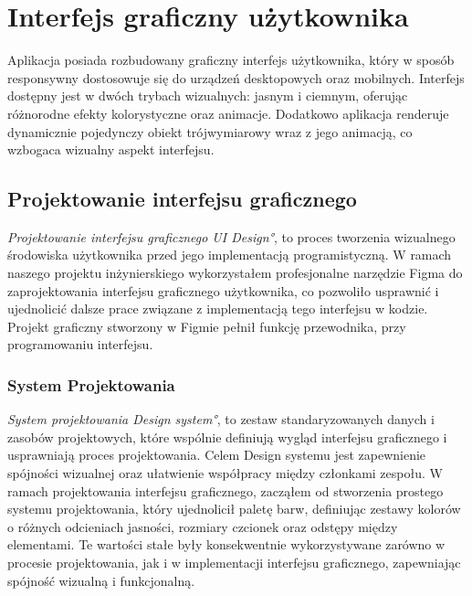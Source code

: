 \chapter{Interfejs graficzny użytkownika}
\label{chap:InterfejsGraficznyUżytkownika}
Aplikacja posiada rozbudowany graficzny interfejs użytkownika, który w sposób responsywny dostosowuje się do urządzeń desktopowych oraz mobilnych. Interfejs dostępny jest w dwóch trybach wizualnych: jasnym i ciemnym, oferując różnorodne efekty kolorystyczne oraz animacje. Dodatkowo aplikacja renderuje dynamicznie pojedynczy obiekt trójwymiarowy wraz z jego animacją, co wzbogaca wizualny aspekt interfejsu.

\section{Projektowanie interfejsu graficznego}
\label{sec:ProjektowanieInterfejsuGraficznego}

\emph{Projektowanie interfejsu graficznego \ang{UI Design}}, to proces tworzenia wizualnego środowiska użytkownika przed jego implementacją programistyczną. W ramach naszego projektu inżynierskiego wykorzystałem profesjonalne narzędzie Figma \cite{Figma} do zaprojektowania interfejsu graficznego użytkownika, co pozwoliło usprawnić i ujednolicić dalsze prace związane z implementacją tego interfejsu w kodzie. Projekt graficzny stworzony w Figmie pełnił funkcję przewodnika, przy programowaniu interfejsu.


\subsection{System Projektowania}
\label{sec:SystemProjektowania}

\emph{System projektowania \ang{Design system}}, to zestaw standaryzowanych danych i zasobów projektowych, które wspólnie definiują wygląd interfejsu graficznego i usprawniają proces projektowania. Celem Design systemu jest zapewnienie spójności wizualnej oraz ułatwienie współpracy między członkami zespołu. 
W ramach projektowania interfejsu graficznego, zacząłem od stworzenia prostego systemu projektowania, który ujednolicił paletę barw, definiując zestawy kolorów o różnych odcieniach jasności, rozmiary czcionek oraz odstępy między elementami. Te wartości stałe były konsekwentnie wykorzystywane zarówno w procesie projektowania, jak i w implementacji interfejsu graficznego, zapewniając spójność wizualną i funkcjonalną. 

